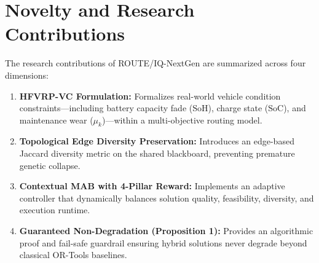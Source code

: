 \section{Novelty and Research Contributions}
\label{sec:contributions}
The research contributions of ROUTE/IQ-NextGen are summarized across four dimensions:
\begin{enumerate}
    \item \textbf{HFVRP-VC Formulation:} Formalizes real-world vehicle condition constraints---including battery capacity fade ($\text{SoH}$), charge state ($\text{SoC}$), and maintenance wear ($\mu_k$)---within a multi-objective routing model.
    \item \textbf{Topological Edge Diversity Preservation:} Introduces an edge-based Jaccard diversity metric on the shared blackboard, preventing premature genetic collapse.
    \item \textbf{Contextual MAB with 4-Pillar Reward:} Implements an adaptive controller that dynamically balances solution quality, feasibility, diversity, and execution runtime.
    \item \textbf{Guaranteed Non-Degradation (Proposition 1):} Provides an algorithmic proof and fail-safe guardrail ensuring hybrid solutions never degrade beyond classical OR-Tools baselines.
\end{enumerate}
